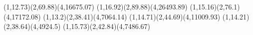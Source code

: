 {(1,12.73)(2,69.88)(4,16675.07)}
{(1,16.92)(2,89.88)(4,26493.89)}
{(1,15.16)(2,76.1)(4,17172.08)}
{(1,13.2)(2,38.41)(4,7064.14)}
{(1,14.71)(2,44.69)(4,11009.93)}
{(1,14.21)(2,38.64)(4,4924.5)}
{(1,15.73)(2,42.84)(4,7486.67)}